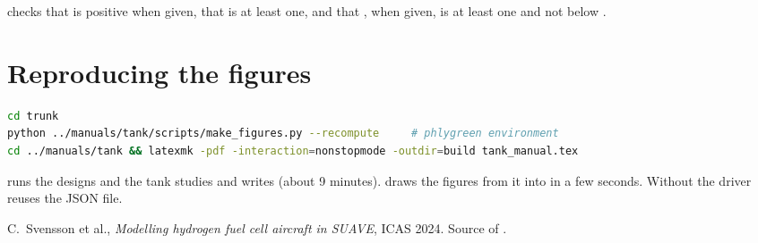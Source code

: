 \documentclass[a4paper,11pt]{article}
\begin{document}
 checks that  is positive when given, that
 is at least one, and that , when given, is at
least one and not below .

\section{Reproducing the figures}

\begin{lstlisting}[language=bash]
cd trunk
python ../manuals/tank/scripts/make_figures.py --recompute     # phlygreen environment
cd ../manuals/tank && latexmk -pdf -interaction=nonstopmode -outdir=build tank_manual.tex
\end{lstlisting}
 runs the designs and the tank studies and writes
 (about 9 minutes).  draws the figures from it into
 in a few seconds. Without  the driver reuses the JSON file.

\begin{thebibliography}{9}\small
{} C.~Svensson et al., \emph{Modelling hydrogen fuel cell aircraft in SUAVE},
ICAS 2024. Source of .
\end{thebibliography}
\end{document}
